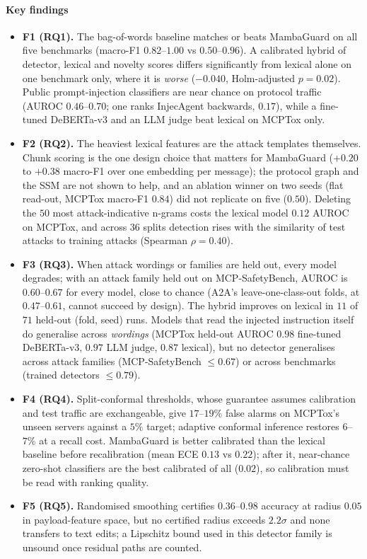 \documentclass[conference,compsoc]{IEEEtran}
\begin{document}
\paragraph{Key findings}
\begin{itemize}
  \item \textbf{F1 (RQ1).} The bag-of-words baseline matches or beats MambaGuard on all five benchmarks (macro-F1 $0.82$--$1.00$ vs $0.50$--$0.96$). A calibrated hybrid of detector, lexical and novelty scores differs significantly from lexical alone on one benchmark only, where it is \emph{worse} ($-0.040$, Holm-adjusted $p=0.02$). Public prompt-injection classifiers are near chance on protocol traffic (AUROC $0.46$--$0.70$; one ranks InjecAgent backwards, $0.17$), while a fine-tuned DeBERTa-v3 and an LLM judge beat lexical on MCPTox only.
  \item \textbf{F2 (RQ2).} The heaviest lexical features are the attack templates themselves. Chunk scoring is the one design choice that matters for MambaGuard ($+0.20$ to $+0.38$ macro-F1 over one embedding per message); the protocol graph and the SSM are not shown to help, and an ablation winner on two seeds (flat read-out, MCPTox macro-F1 $0.84$) did not replicate on five ($0.50$). Deleting the $50$ most attack-indicative n-grams costs the lexical model $0.12$ AUROC on MCPTox, and across $36$ splits detection rises with the similarity of test attacks to training attacks (Spearman $\rho=0.40$).
  \item \textbf{F3 (RQ3).} When attack wordings or families are held out, every model degrades; with an attack family held out on MCP-SafetyBench, AUROC is $0.60$--$0.67$ for every model, close to chance (A2A's leave-one-class-out folds, at $0.47$--$0.61$, cannot succeed by design). The hybrid improves on lexical in $11$ of $71$ held-out (fold, seed) runs. Models that read the injected instruction itself do generalise across \emph{wordings} (MCPTox held-out AUROC $0.98$ fine-tuned DeBERTa-v3, $0.97$ LLM judge, $0.87$ lexical), but no detector generalises across attack families (MCP-SafetyBench $\le0.67$) or across benchmarks (trained detectors $\le0.79$).
  \item \textbf{F4 (RQ4).} Split-conformal thresholds, whose guarantee assumes calibration and test traffic are exchangeable, give $17$--$19\%$ false alarms on MCPTox's unseen servers against a $5\%$ target; adaptive conformal inference restores $6$--$7\%$ at a recall cost. MambaGuard is better calibrated than the lexical baseline before recalibration (mean ECE $0.13$ vs $0.22$); after it, near-chance zero-shot classifiers are the best calibrated of all ($0.02$), so calibration must be read with ranking quality.
  \item \textbf{F5 (RQ5).} Randomised smoothing certifies $0.36$--$0.98$ accuracy at radius $0.05$ in payload-feature space, but no certified radius exceeds $2.2\sigma$ and none transfers to text edits; a Lipschitz bound used in this detector family is unsound once residual paths are counted.
\end{itemize}
\end{document}
